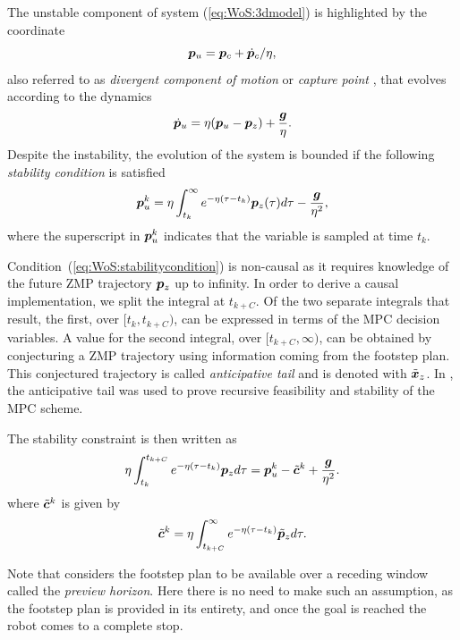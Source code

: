 The unstable component of system (\ref{eq:WoS:3dmodel}) is highlighted by the coordinate
\begin{equation*}
    {\bm{p}}_u = {\bm{p}}_c + \dot {{\bm{p}}}_c/\eta,
\end{equation*}
also referred to as \textit{divergent component of motion} \cite{EnOtAl:15} or \textit{capture point} \cite{PrCaDrGo:06}, that evolves according to the dynamics
\begin{equation}
\dot{{\bm{p}}}_u = \eta({\bm{p}}_u - {\bm{p}}_z) + \frac{{\bm{g}}}{\eta}.
\end{equation}
Despite the instability, the evolution of the system is bounded if the following \emph{stability condition} is satisfied
\begin{equation}
\label{eq:WoS:stabilitycondition}
{\bm{p}}_u^k = \eta\int_{t_k}^{\infty}e^{-\eta(\tau - t_k)}{\bm{p}}_z(\tau) d\tau - \frac{{\bm{g}}}{\eta^2},
\end{equation}
where the superscript in ${{\bm{p}}}_u^k$ indicates that the variable is sampled at time $t_k$.

Condition~(\ref{eq:WoS:stabilitycondition}) is non-causal as it requires knowledge of the future ZMP trajectory ${\bm{p}}_z$ up to infinity. In order to derive a causal implementation, we split the integral at $t_{k+C}$. Of the two separate integrals that result, the first, over $[t_k, t_{k+C})$, can be expressed in terms of the MPC decision variables. A value for the second integral, over $[t_{k+C}, \infty)$, can be obtained by conjecturing a ZMP trajectory using information coming from the footstep plan.
This conjectured trajectory is called \emph{anticipative tail} and is denoted with $\tilde {{\bm{x}}}_z$. 
In \cite{ScDeLaOr:20}, the anticipative tail was used to prove recursive feasibility and stability of the MPC scheme.

The stability constraint is then written as
\begin{equation}\label{eq:WoS:stability_constraint}
\eta\int_{t_k}^{t_{k+C}}e^{-\eta(\tau - t_k)}{\bm{p}}_z d\tau = {\bm{p}}_u^k - \tilde {{\bm{c}}}^k + \frac{{\bm{g}}}{\eta^2}.
\end{equation}
where $\tilde {{\bm{c}}}^k$ is given by
\begin{equation}%
\tilde\bfc^k = \eta\int_{t_{k+C}}^{\infty}e^{-\eta(\tau - t_k)}\tilde\bfp_z d\tau.
\end{equation}

Note that \cite{ScDeLaOr:20} considers the footstep plan to be available over a receding window called the \emph{preview horizon}. Here there is no need to make such an assumption, as the footstep plan is provided in its entirety, and once the goal is reached the robot comes to a complete stop.


